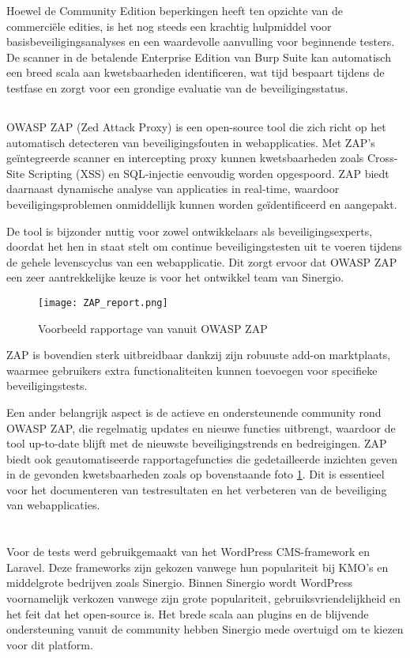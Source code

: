 Hoewel de Community Edition beperkingen heeft ten opzichte van de 
commerciële edities, is het nog steeds een krachtig hulpmiddel voor basisbeveiligingsanalyses en een waardevolle aanvulling 
voor beginnende testers. De scanner in de betalende Enterprise Edition van Burp Suite kan automatisch een breed scala aan kwetsbaarheden 
identificeren, wat tijd bespaart tijdens de testfase en zorgt voor een grondige evaluatie van de beveiligingsstatus.

\subsection{}
OWASP ZAP (Zed Attack Proxy) is een open-source tool die zich richt op het automatisch detecteren van beveiligingsfouten in 
webapplicaties. Met ZAP's geïntegreerde scanner en intercepting proxy kunnen 
kwetsbaarheden zoals Cross-Site Scripting (XSS) en SQL-injectie eenvoudig worden opgespoord. ZAP biedt 
daarnaast dynamische analyse van applicaties in real-time, waardoor beveiligingsproblemen onmiddellijk kunnen worden geïdentificeerd 
en aangepakt.

De tool is bijzonder nuttig voor zowel ontwikkelaars als beveiligingsexperts, doordat het hen in staat stelt 
om continue beveiligingstesten uit te voeren tijdens de gehele levenscyclus van een webapplicatie. Dit zorgt ervoor dat 
OWASP ZAP een zeer aantrekkelijke keuze is voor het ontwikkel team van Sinergio.
\begin{figure}
    \centering
    \texttt{[image: ZAP\_report.png]}
    \caption[Voorbeeld rapportage van vanuit OWASP ZAP]{Voorbeeld rapportage van vanuit OWASP ZAP}
    \label{fig:zap_report}
\end{figure}
ZAP is bovendien sterk uitbreidbaar dankzij zijn robuuste add-on marktplaats, waarmee gebruikers extra functionaliteiten 
kunnen toevoegen voor specifieke beveiligingstests. 

Een ander belangrijk aspect is de actieve en ondersteunende community 
rond OWASP ZAP, die regelmatig updates en nieuwe functies uitbrengt, waardoor de tool up-to-date blijft met de nieuwste 
beveiligingstrends en bedreigingen. ZAP biedt ook geautomatiseerde rapportagefuncties die gedetailleerde inzichten geven 
in de gevonden kwetsbaarheden zoals op bovenstaande foto \ref{fig:zap_report}. Dit is essentieel voor het documenteren van testresultaten en het verbeteren van de beveiliging 
van webapplicaties. 

\section{}
Voor de tests werd gebruikgemaakt van het WordPress CMS-framework en Laravel. Deze frameworks zijn gekozen vanwege hun 
populariteit bij KMO's en middelgrote bedrijven zoals Sinergio. Binnen Sinergio wordt WordPress voornamelijk verkozen vanwege 
zijn grote populariteit, gebruiksvriendelijkheid en het feit dat het open-source is. Het brede scala aan plugins en de 
blijvende ondersteuning vanuit de community hebben Sinergio mede overtuigd om te kiezen voor dit platform. 



